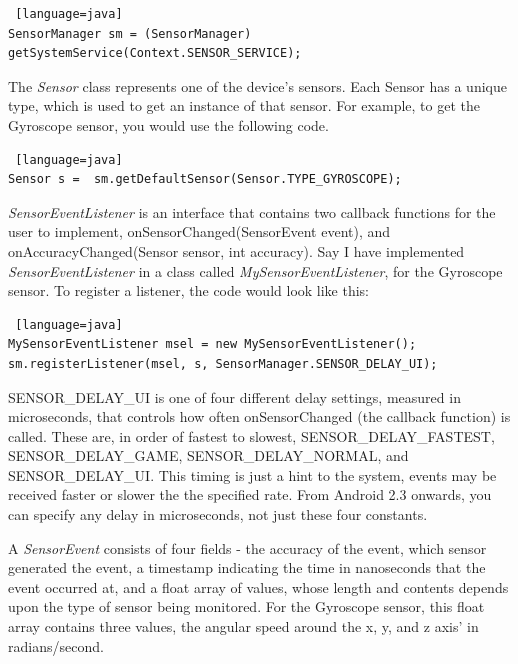\documentclass[paper=letter, fontsize=11pt]{scrartcl}
\numberwithin{equation}{section}
\numberwithin{figure}{section}
\numberwithin{table}{section}
\begin{document}
\begin{lstlisting} [language=java]
SensorManager sm = (SensorManager) getSystemService(Context.SENSOR_SERVICE);
\end{lstlisting}

\par
The {\em Sensor} class represents one of the device's sensors. Each Sensor has a unique type, which is used to get an instance of that sensor. For example, to get the Gyroscope sensor, you would use the following code.\\

\begin{lstlisting} [language=java]
Sensor s =  sm.getDefaultSensor(Sensor.TYPE_GYROSCOPE);
\end{lstlisting}

\par
{\em SensorEventListener} is an interface that contains two callback functions for the user to implement, onSensorChanged(SensorEvent event), and onAccuracyChanged(Sensor sensor, int accuracy). Say I have implemented {\em SensorEventListener} in a class called {\em MySensorEventListener}, for the Gyroscope sensor. To register a listener, the code would look like this:\\

\begin{lstlisting} [language=java]
MySensorEventListener msel = new MySensorEventListener();
sm.registerListener(msel, s, SensorManager.SENSOR_DELAY_UI);
\end{lstlisting}

\par
SENSOR\_DELAY\_UI is one of four different delay settings, measured in microseconds, that controls how often onSensorChanged (the callback function) is called. These are, in order of fastest to slowest, SENSOR\_DELAY\_FASTEST, SENSOR\_DELAY\_GAME, SENSOR\_DELAY\_NORMAL, and SENSOR\_DELAY\_UI. This timing is just a hint to the system, events may be received faster or slower the the specified rate. From Android 2.3 onwards, you can specify any delay in microseconds, not just these four constants.\\

\par
A {\em SensorEvent} consists of four fields - the accuracy of the event, which sensor generated the event, a timestamp indicating the time in nanoseconds that the event occurred at, and a float array of values, whose length and contents depends upon the type of sensor being monitored. For the Gyroscope sensor, this float array contains three values, the angular speed around the x, y, and z axis' in radians/second.\\
\end{document}
